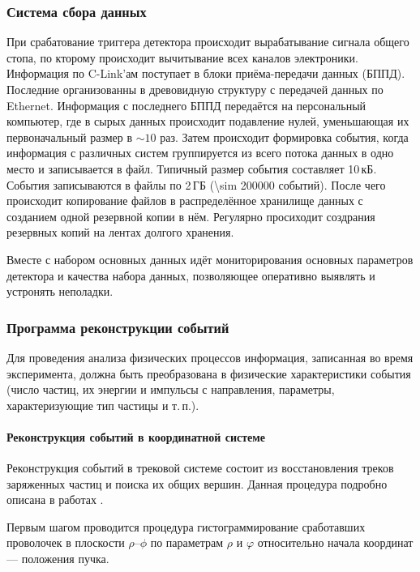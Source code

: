 \subsubsection{Система сбора данных}\label{sec:daq}

При срабатование триггера детектора происходит вырабатывание сигнала общего стопа,
по кторому происходит вычитывание всех каналов электроники.
Информация по C-Link'ам поступает в блоки приёма-передачи данных (БППД).
Последние организованны в древовидную структуру с передачей данных по Ethernet.
Информация с последнего БППД передаётся на персональный компьютер,
где в сырых данных происходит подавление нулей,
уменьшающая их первоначальный размер в $\sim 10$ раз.
Затем происходит формировка события,
когда информация с различных систем группируется из всего потока данных в одно место и записывается в файл.
Типичный размер события составляет 10\,кБ.
События записываются в файлы по 2\,ГБ (\num{\sim 200000} событий).
После чего происходит копирование файлов в распределённое хранилище данных с созданием одной резервной копии в нём.
Регулярно просиходит создрания резервных копий на лентах долгого хранения.

Вместе с набором основных данных идёт мониторирования основных параметров детектора и качества набора данных,
позволяющее оперативно выявлять и устронять неполадки.




\subsubsection{Программа реконструкции событий}\label{sec:event_reco}


Для проведения анализа физических процессов информация,
записанная во время эксперимента,
должна быть преобразована в физические характеристики события
(число частиц,
их энергии и импульсы с направления,
параметры,
характеризующие тип частицы и т.\,п.).


\paragraph{Реконструкция событий в координатной системе}

Реконструкция событий в трековой системе состоит из восстановления треков заряженных частиц и поиска их общих вершин.
Данная процедура подробно описана в работах \cite{Karawdina:2007:track_reco}.


Первым шагом проводится процедура гистограммирование сработавших проволочек
в плоскости $\rho$--$\phi$ по параметрам $\rho$ и $\varphi$ относительно начала координат
--- положения пучка.


